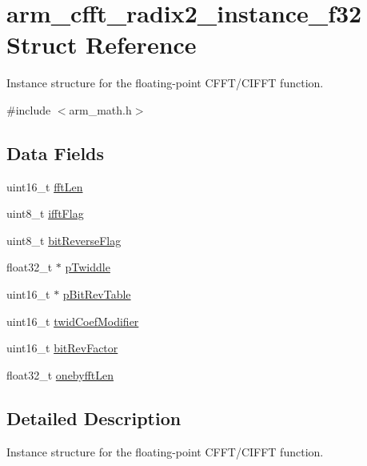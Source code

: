 \hypertarget{structarm__cfft__radix2__instance__f32}{}\section{arm\+\_\+cfft\+\_\+radix2\+\_\+instance\+\_\+f32 Struct Reference}
\label{structarm__cfft__radix2__instance__f32}


Instance structure for the floating-\/point C\+F\+F\+T/\+C\+I\+F\+FT function.  




{\ttfamily \#include $<$arm\+\_\+math.\+h$>$}

\subsection*{Data Fields}
\begin{DoxyCompactItemize}
\item 
uint16\+\_\+t \mbox{\hyperlink{structarm__cfft__radix2__instance__f32_ab8db3bbe7c61e6bb8ca2a55e3446e11a}{fft\+Len}}
\item 
uint8\+\_\+t \mbox{\hyperlink{structarm__cfft__radix2__instance__f32_ad6ca6e223f986ebfd94c5ee1e410aa73}{ifft\+Flag}}
\item 
uint8\+\_\+t \mbox{\hyperlink{structarm__cfft__radix2__instance__f32_a09a221a818c6d0e064557a99e2fe9a8b}{bit\+Reverse\+Flag}}
\item 
float32\+\_\+t $\ast$ \mbox{\hyperlink{structarm__cfft__radix2__instance__f32_aca581481fccdff0f557f54a3ef20d967}{p\+Twiddle}}
\item 
uint16\+\_\+t $\ast$ \mbox{\hyperlink{structarm__cfft__radix2__instance__f32_a46a2fb328199897af100fea0bfdf59aa}{p\+Bit\+Rev\+Table}}
\item 
uint16\+\_\+t \mbox{\hyperlink{structarm__cfft__radix2__instance__f32_afe772e5b5001c9d8e85032115a8df5bf}{twid\+Coef\+Modifier}}
\item 
uint16\+\_\+t \mbox{\hyperlink{structarm__cfft__radix2__instance__f32_a33386d95319dc3ee7097b3a8e52e01ec}{bit\+Rev\+Factor}}
\item 
float32\+\_\+t \mbox{\hyperlink{structarm__cfft__radix2__instance__f32_acf295a7b97b7d48a9cae4d1ab5ed00f6}{onebyfft\+Len}}
\end{DoxyCompactItemize}


\subsection{Detailed Description}
Instance structure for the floating-\/point C\+F\+F\+T/\+C\+I\+F\+FT function. 

